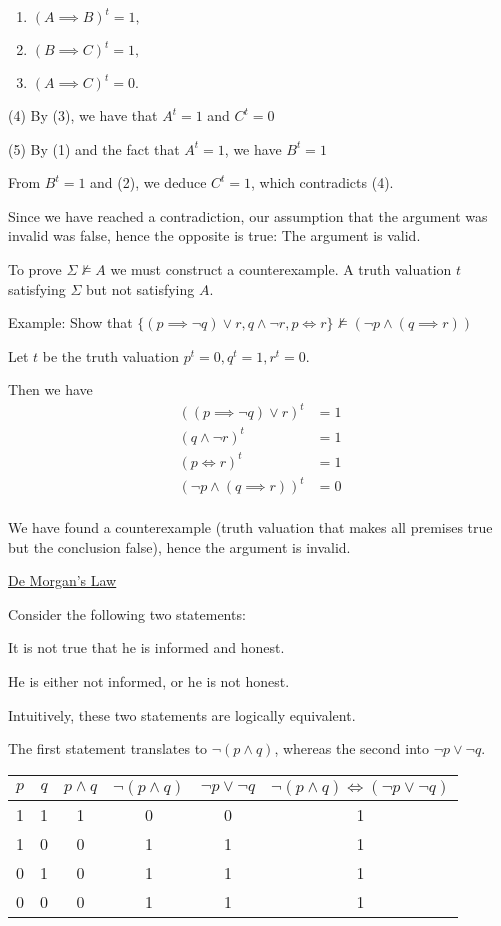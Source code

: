 \documentclass{article}
\begin{document}
\begin{enumerate}
\item $(A \implies B)^t = 1,$
\item $(B \implies C)^t = 1,$
\item $(A \implies C)^t = 0.$
\end{enumerate}

(4) By (3), we have that $A^t = 1$ and $C^t = 0$

(5) By (1) and the fact that $A^t = 1$, we have $B^t = 1$

From $B^t = 1$ and (2), we deduce $C^t = 1$, which contradicts (4).

Since we have reached a contradiction, our assumption that the argument was invalid was false, hence the opposite is true: The argument is valid. 

To prove $\Sigma \not\vDash A$ we must construct a counterexample. A truth valuation $t$ satisfying $\Sigma$ but not satisfying $A$. 

Example: Show that $\{(p \implies \neg q) \vee r, q \wedge \neg r, p \iff r\} \not\vDash (\neg p \wedge (q \implies r))$

Let $t$ be the truth valuation $p^t = 0, q^t = 1, r^t = 0$. 

Then we have
\begin{align*}
((p \implies \neg q) \vee r)^t &= 1\\
(q \wedge \neg r)^t &= 1\\
(p \iff r)^t &= 1\\
(\neg p \wedge (q \implies r))^t &= 0\\
\end{align*}

We have found a counterexample (truth valuation that makes all premises true but the conclusion false), hence the argument is invalid. 

\underline{De Morgan's Law}

Consider the following two statements:

It is not true that he is informed and honest. 

He is either not informed, or he is not honest. 

Intuitively, these two statements are logically equivalent. 

The first statement translates to $\neg(p \wedge q)$, whereas the second into $\neg p \vee \neg q$.


\begin{table}[h]
    \centering
    \begin{tabular}{|c|c|c|c|c|c|} \hline
         $p$&  $q$&  $p \wedge q$&  $\neg (p \wedge q)$& $\neg p \vee \neg q$ & $\neg (p \wedge q) \iff (\neg p \vee \neg q)$ \\ \hline
         1&  1&  1&  0&  0& 1\\
         1&  0&  0&  1&  1& 1\\
         0&  1&  0&  1&  1& 1\\
         0&  0&  0&  1&  1& 1\\ \hline
    \end{tabular}
\end{table}
\end{document}
